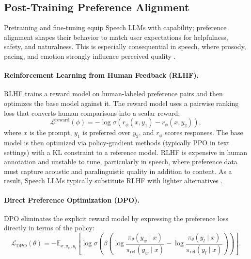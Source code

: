 \subsection{Post-Training Preference Alignment}
\label{subsec:training_alignment}

Pretraining and fine-tuning equip Speech LLMs with capability; preference
alignment shapes their behavior to match user expectations for
helpfulness, safety, and naturalness. This is especially consequential in
speech, where prosody, pacing, and emotion strongly influence perceived
quality \citep{communication2023seamlessmultilingualexpressivestreaming}.

\paragraph{Reinforcement Learning from Human Feedback (RLHF).}
RLHF \citep{ouyang2022training,christiano2017deep} trains a reward model
on human-labeled preference pairs and then optimizes the base model
against it. The reward model uses a pairwise ranking loss that converts
human comparisons into a scalar reward:
\begin{equation}
\mathcal{L}^{\text{reward}}(\phi) = -\log \sigma\left( r_\phi(x, y_1) - r_\phi(x, y_2) \right),
\end{equation}
where $x$ is the prompt, $y_1$ is preferred over $y_2$, and $r_\phi$
scores responses. The base model is then optimized via policy-gradient
methods (typically PPO \citep{schulman2017proximalpolicyoptimizationalgorithms}
in text settings) with a KL constraint to a reference model. RLHF is
expensive in human annotation and unstable to tune, particularly in
speech, where preference data must capture acoustic and paralinguistic
quality in addition to content. As a result, Speech LLMs typically
substitute RLHF with lighter alternatives \citep{rafailov2023direct}.

\paragraph{Direct Preference Optimization (DPO).}
DPO \citep{rafailov2023direct} eliminates the explicit reward model by
expressing the preference loss directly in terms of the policy:
\begin{equation}
\mathcal{L}_{\mathrm{DPO}}(\theta)
= - \mathbb{E}_{x,y_w,y_l}
\left[
\log \sigma \left(
\beta \left(
\log \frac{\pi_\theta(y_w \mid x)}{\pi_{\mathrm{ref}}(y_w \mid x)}
-
\log \frac{\pi_\theta(y_l \mid x)}{\pi_{\mathrm{ref}}(y_l \mid x)}
\right)
\right)
\right].
\end{equation}

